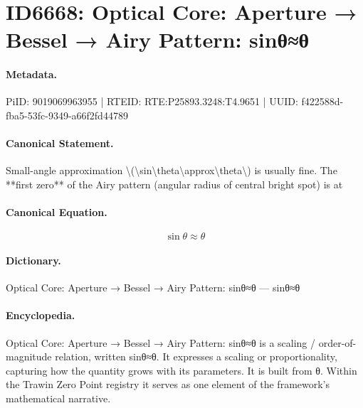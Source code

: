\section*{ID6668: Optical Core: Aperture → Bessel → Airy Pattern: sinθ≈θ}
\paragraph{Metadata.}
PiID: 9019069963955 | RTEID: RTE:P25893.3248:T4.9651 | UUID: f422588d-fba5-53fc-9349-a66f2fd44789

\paragraph{Canonical Statement.}
Small-angle approximation \textbackslash{}(\textbackslash{}sin\textbackslash{}theta\textbackslash{}approx\textbackslash{}theta\textbackslash{}) is usually fine. The **first zero** of the Airy pattern (angular radius of central bright spot) is at

\paragraph{Canonical Equation.}
\[
\sin\theta\approx\theta
\]

\paragraph{Dictionary.}
Optical Core: Aperture → Bessel → Airy Pattern: sinθ≈θ — sinθ≈θ

\paragraph{Encyclopedia.}
Optical Core: Aperture → Bessel → Airy Pattern: sinθ≈θ is a scaling / order-of-magnitude relation, written sinθ≈θ. It expresses a scaling or proportionality, capturing how the quantity grows with its parameters. It is built from θ. Within the Trawin Zero Point registry it serves as one element of the framework's mathematical narrative.
